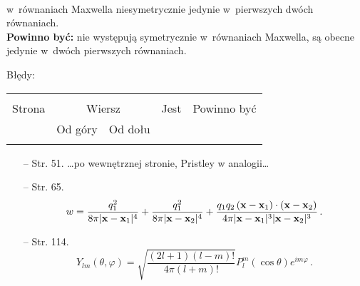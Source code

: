 \documentclass[a4paper,11pt]{article}
\begin{document}
 \\
\Jest  w~równaniach Maxwella niesymetrycznie jedynie w~pierwszych dwóch równaniach. \\
\textbf{Powinno być:} nie występują symetrycznie w~równaniach Maxwella, są obecne jedynie w~dwóch pierwszych równaniach. \\

\vspace{\spaceTwo}








Błędy:\\
\begin{tabular}{|c|c|c|c|c|}
\hline
& \multicolumn{2}{c|}{} & & \\
Strona & \multicolumn{2}{c|}{Wiersz} & Jest & Powinno być \\ \cline{2-3}
& Od góry & Od dołu &  &  \\ \hline
& & & & \\

\end{tabular}

\begin{itemize}
\item[--] Str. 51. \ldots po wewnętrznej stronie, Pristley w analogii\ldots
\item[--] Str. 65. $$w = \frac{ q^{ 2 }_{ 1 } }{ 8 \pi | \bold{ x } - \bold{ x }_{ 1 } |^{ 4 } } + \frac{ q^{ 2 }_{ 1 } }{ 8 \pi | \bold{ x } - \bold{ x }_{ 2 } |^{ 4 } } + \frac{ q_{ 1 } q_{ 2 } \, ( \bold{ x } - \bold{ x }_{ 1 } ) \cdot ( \bold{ x } - \bold{ x }_{ 2 } ) }{ 4 \pi | \bold{ x } - \bold{ x }_{ 1 } |^{ 3 } | \bold{ x } - \bold{ x }_{ 2 } |^{ 3 } } \, .$$
\item[--] Str. 114. $$Y_{ l m }( \theta, \varphi ) = \sqrt{ \frac{ ( 2l + 1 )( l - m )! }{ 4 \pi ( l + m )! } } P^{ m }_{ l }( \cos \theta ) e^{ i m \varphi} \, .$$
\end{itemize}
\noindent\\










{}






\end{document}
